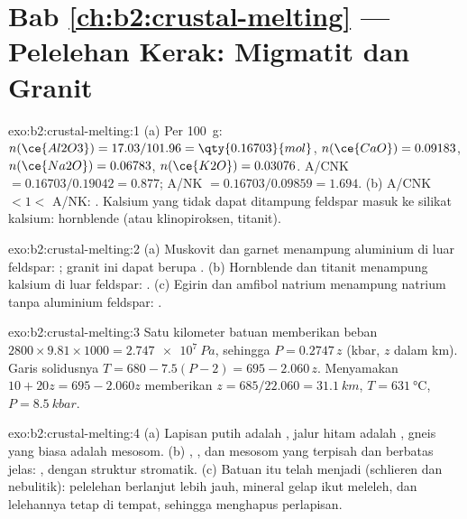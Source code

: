 \section*{Bab \ref{ch:b2:crustal-melting} --- Pelelehan Kerak: Migmatit dan Granit}

\begin{solution}{exo:b2:crustal-melting:1}
(a) Per \qty{100}{\gram}: $n(\ce{Al2O3}) = 17.03/101.96 = \qty{0.16703}{mol}$,
$n(\ce{CaO}) = 0.09183$, $n(\ce{Na2O}) = 0.06783$, $n(\ce{K2O}) = 0.03076$.
A/CNK $= 0.16703/0.19042 = 0.877$; A/NK $= 0.16703/0.09859 = 1.694$.
(b) A/CNK $< 1 <$ A/NK: . Kalsium yang tidak dapat ditampung feldspar masuk ke
silikat kalsium: hornblende (atau klinopiroksen, titanit).
\end{solution}

\begin{solution}{exo:b2:crustal-melting:2}
(a) Muskovit dan garnet menampung aluminium di luar feldspar: ; granit ini
dapat berupa . (b) Hornblende dan titanit menampung kalsium di luar feldspar:
. (c) Egirin dan amfibol natrium menampung natrium tanpa aluminium
feldspar: .
\end{solution}

\begin{solution}{exo:b2:crustal-melting:3}
Satu kilometer batuan memberikan beban $2800\times9.81\times1000 = \qty{2.747e7}{Pa}$, sehingga
$P = 0.2747\,z$ (\unit{kbar}, $z$ dalam \unit{km}). Garis solidusnya $T = 680 - 7.5(P -
2) = 695 - 2.060\,z$. Menyamakan $10 + 20z = 695 - 2.060z$ memberikan $z = 685/22.060 =
\qty{31.1}{km}$, $T = \qty{631}{\celsius}$, $P = \qty{8.5}{kbar}$.
\end{solution}

\begin{solution}{exo:b2:crustal-melting:4}
(a) Lapisan putih adalah , jalur hitam adalah , gneis yang biasa adalah
mesosom. (b) , , dan mesosom yang terpisah dan berbatas jelas: ,
dengan struktur stromatik. (c) Batuan itu telah menjadi  (schlieren dan nebulitik):
pelelehan berlanjut lebih jauh, mineral gelap ikut meleleh, dan lelehannya tetap di tempat,
sehingga menghapus perlapisan.
\end{solution}

